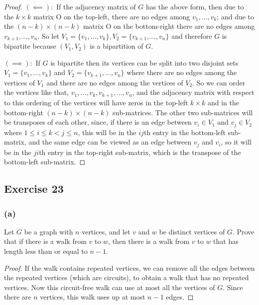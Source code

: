 \documentclass[14pt]{extarticle}
\begin{document}
\begin{proof}
    \(\bm{(\impliedby):}\) If the adjacency matrix of \(G\) has the above form, then due to the \(k \times k\) matrix O on the
    top-left, there are no edges among \(v_1, \ldots, v_k\); and due to the \((n-k) \times (n-k)\) matrix O on the bottom-right
    there are no edges among \(v_{k+1}, \ldots, v_n\). So let \(V_1 = \{v_1, \ldots, v_k\}, V_2 = \{v_{k+1}, \ldots, v_n\}\)
    and therefore \(G\) is bipartite because \((V_1, V_2)\) is a bipartition of \(G\).

    \(\bm{(\implies):}\) If \(G\) is bipartite then its vertices can be split into two disjoint sets \(V_1 = \{v_1, \ldots,
    v_k\}\) and \(V_2 = \{v_{k+1}, \ldots, v_n\}\) where there are no edges among the vertices of \(V_1\) and there are no edges
    among the vertices of \(V_2\). So we can order the vertices like that, \(v_1, \ldots, v_k, v_{k+1}, \ldots, v_n\), and
    the adjacency matrix with respect to this ordering of the vertices will have zeros in the top-left \(k \times k\) and in
    the bottom-right \((n-k) \times (n-k)\) sub-matrices. The other two sub-matrices will be transposes of each other,
    since, if there is an edge between \(v_i \in V_1\) and \(v_j \in V_2\) where \(1 \leq i \leq k < j \leq n\), this will be
    in the \(ij\)th entry in the bottom-left sub-matrix, and the same edge can be viewed as an edge between \(v_j\) and
    \(v_i\), so it will be in the \(ji\)th entry in the top-right
    sub-matrix, which is the transpose of the bottom-left sub-matrix.
\end{proof}

\subsection{Exercise 23}
\subsubsection{(a)}
Let \(G\) be a graph with \(n\) vertices, and let \(v\) and \(w\) be distinct vertices of \(G\). Prove that if there is a
walk from \(v\) to \(w\), then there is a walk from \(v\) to \(w\) that has length less than or equal to \(n - 1\).

\begin{proof}
    If the walk contains repeated vertices, we can remove all the edges between the repeated vertices (which are circuits), to
    obtain a walk that has no repeated vertices. Now this circuit-free walk can use at most all the vertices of \(G\). Since
    there are \(n\) vertices, this walk uses up at most \(n-1\) edges.
\end{proof}
\end{document}
